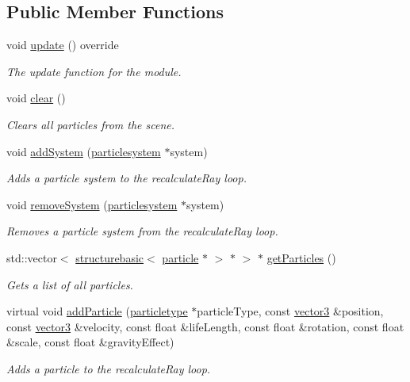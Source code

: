 \subsection*{Public Member Functions}
\begin{DoxyCompactItemize}
\item 
void \hyperlink{classflounder_1_1particles_a12f1dd9883cc49987f6ff0ca3105bdb6}{update} () override
\begin{DoxyCompactList}\small\item\em The update function for the module. \end{DoxyCompactList}\item 
void \hyperlink{classflounder_1_1particles_aba5f1d3ae0abf22fbc73463075e4777f}{clear} ()
\begin{DoxyCompactList}\small\item\em Clears all particles from the scene. \end{DoxyCompactList}\item 
void \hyperlink{classflounder_1_1particles_a39a6e05f1323ebf326930ef2e9b72a3e}{add\+System} (\hyperlink{classflounder_1_1particlesystem}{particlesystem} $\ast$system)
\begin{DoxyCompactList}\small\item\em Adds a particle system to the recalculate\+Ray loop. \end{DoxyCompactList}\item 
void \hyperlink{classflounder_1_1particles_a33af75a6466ece3ab1b661bcdffae201}{remove\+System} (\hyperlink{classflounder_1_1particlesystem}{particlesystem} $\ast$system)
\begin{DoxyCompactList}\small\item\em Removes a particle system from the recalculate\+Ray loop. \end{DoxyCompactList}\item 
std\+::vector$<$ \hyperlink{classflounder_1_1structurebasic}{structurebasic}$<$ \hyperlink{classflounder_1_1particle}{particle} $\ast$ $>$ $\ast$ $>$ $\ast$ \hyperlink{classflounder_1_1particles_a73468a12149371a445e01fa178684aa0}{get\+Particles} ()
\begin{DoxyCompactList}\small\item\em Gets a list of all particles. \end{DoxyCompactList}\item 
virtual void \hyperlink{classflounder_1_1particles_afa14d05372032644982a5ce2f96bd5e5}{add\+Particle} (\hyperlink{classflounder_1_1particletype}{particletype} $\ast$particle\+Type, const \hyperlink{classflounder_1_1vector3}{vector3} \&position, const \hyperlink{classflounder_1_1vector3}{vector3} \&velocity, const float \&life\+Length, const float \&rotation, const float \&scale, const float \&gravity\+Effect)
\begin{DoxyCompactList}\small\item\em Adds a particle to the recalculate\+Ray loop. \end{DoxyCompactList}\end{DoxyCompactItemize}
